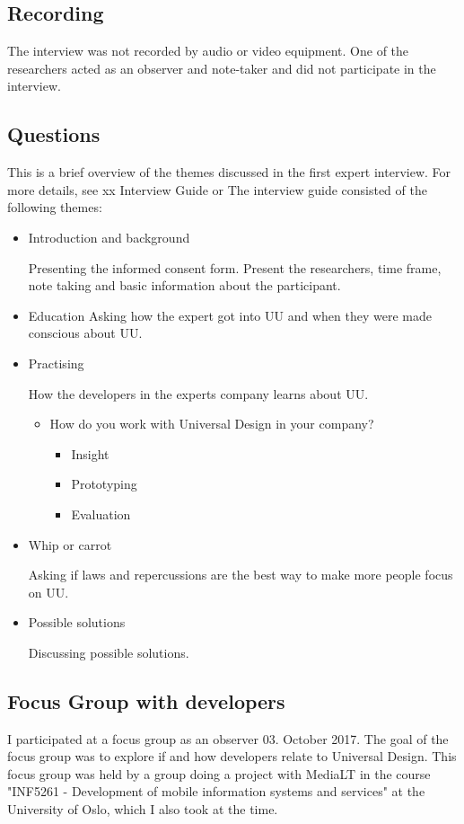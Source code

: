 \subsection{Recording}
The interview was not recorded by audio or video equipment. One of the researchers acted as an observer and note-taker and did not participate in the interview. 

\subsection{Questions}
This is a brief overview of the themes discussed in the first expert interview. For more details, see xx Interview Guide or %
The interview guide consisted of the following themes:
\begin{itemize}
    \item Introduction and background
    
    Presenting the informed consent form. Present the researchers, time frame, note taking and basic information about the participant.
    
    \item Education
    Asking how the expert got into UU and when they were made conscious about UU.
    
    \item Practising
    
    How the developers in the experts company learns about UU.
    \begin{itemize}
        \item How do you work with Universal Design in your company?
        \begin{itemize}
            \item Insight
            \item Prototyping
            \item Evaluation
        \end{itemize}
    \end{itemize}
    \item Whip or carrot
    
    Asking if laws and repercussions are the best way to make more people focus on UU.
    
    \item Possible solutions
    
    Discussing possible solutions.
\end{itemize}

\subsection{Focus Group with developers}
I participated at a focus group as an observer 03. October 2017. The goal of the focus group was to explore if and how developers relate to Universal Design. This focus group was held by a group doing a project with MediaLT in the course "INF5261 - Development of mobile information systems and services" at the University of Oslo, which I also took at the time.

